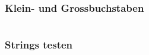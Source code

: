 \begin{minipage}[t]{0.49\textwidth}
	\subsubsection{Klein- und Grossbuchstaben}
	
\end{minipage}
\begin{minipage}[t]{0.02\textwidth} $ \quad $\end{minipage}
\begin{minipage}[t]{0.49\textwidth}
	\subsubsection{Strings testen}
	
\end{minipage}

